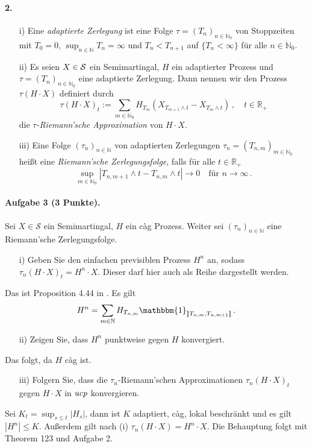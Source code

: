 \documentclass{article}
\begin{document}
\paragraph{ 2.}
\begin{itemize}
\item [i)] Eine \emph{adaptierte Zerlegung} ist eine Folge $\tau=(T_n)_{n\in\mathbb{N}_0}$ von Stoppzeiten mit $T_0=0$, $\sup_{n\in\mathbb{N}}T_n=\infty$ und $T_n<T_{n+1}$ auf $\{T_n<\infty\}$ für alle $n\in\mathbb{N}_0$.
\item [ii)] Es seien $X\in{\cal S}$ ein Semimartingal, $H$ ein adaptierter Prozess und $\tau=(T_n)_{n\in\mathbb{N}_0}$ eine adaptierte Zerlegung.
  Dann nennen wir den Prozess $\tau(H\cdot X)$ definiert durch
  \[
    \tau(H\cdot X)_t:=\sum_{m\in\mathbb{N}_0}H_{T_m}(X_{T_{m+1}\wedge t}-X_{T_m\wedge t})\,,\quad t\in\mathbb{R}_+
  \]
  die \emph{$\tau$-Riemann'sche Approximation} von $H\cdot X$.
\item [iii)] Eine Folge $(\tau_n)_{n\in\mathbb{N}}$ von adaptierten Zerlegungen $\tau_n=(T_{n,m})_{m\in\mathbb{N}_0}$ heißt eine \emph{Riemann'sche Zerlegungsfolge}, falls für alle $t\in\mathbb{R}_+$
  \[
    \sup_{m\in\mathbb{N}_0}|T_{n,m+1}\wedge t-T_{n,m}\wedge t|\to0\quad\text{für }n\to\infty\,.
  \]
\end{itemize}  

\paragraph{Aufgabe 3 \textnormal{(3 Punkte)}.}
Sei $X\in\mathscr{S}$ ein Semimartingal, $H$ ein càg Prozess.
Weiter sei $(\tau_n)_{n\in\mathbb{N}}$ eine Riemann'sche Zerlegungsfolge.
\begin{itemize}
\item [i)] Geben Sie den einfachen previsiblen Prozess $H^n$ an, sodass $\tau_n(H\cdot X)_t=H^n\cdot X$.
  Dieser darf hier auch als Reihe dargestellt werden.
\end{itemize}
Das ist Proposition 4.44 in \cite{jacod2013limit}.
Es gilt
\[
  H^n=\sum_{m\in\mathbb{N}}H_{T_{n,m}}\mathbbm{1}_{\rrbracket T_{n,m},T_{n,m+1}\rrbracket}\,.
\]
\begin{itemize}
\item [ii)] Zeigen Sie, dass $H^n$ punktweise gegen $H$ konvergiert.
\end{itemize}
Das folgt, da $H$ càg ist.
\begin{itemize}
\item [iii)] Folgern Sie, dass die $\tau_n$-Riemann'schen Approximationen $\tau_n(H\cdot X)_t$ gegen $H\cdot X$ in $\emph{ucp}$ konvergieren.
\end{itemize}
Sei $K_t=\sup_{s\leq t}|H_s|$, dann ist $K$ adaptiert, càg, lokal beschränkt und es gilt $|H^n|\leq K$.
Außerdem gilt nach (i) $\tau_n(H\cdot X)=H^n\cdot X$.
Die Behauptung folgt mit Theorem 123 und Aufgabe 2.
\end{document}
